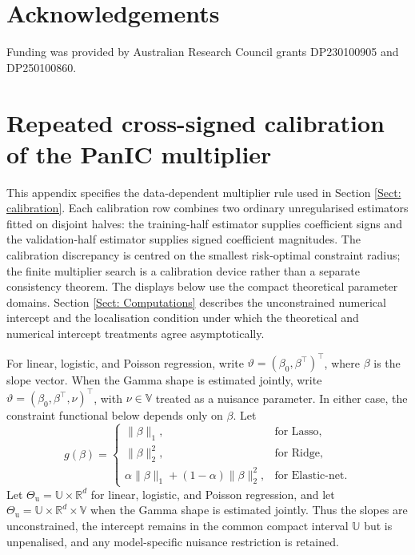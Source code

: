 \documentclass[12pt]{article}
\newenvironment{bluechange}{\begingroup\color[rgb]{0.00,0.00,1.00}}{\endgroup}
\theoremstyle{remark}
\theoremstyle{plain}
\begin{document}
\section*{Acknowledgements}
Funding was provided by Australian Research Council grants DP230100905 and DP250100860.

\appendix

\section[Repeated cross-signed calibration of the PanIC multiplier]{Repeated cross-signed calibration of the PanIC \mbox{multiplier}}\label{App: kappa calibration}
\begin{bluechange}
This appendix specifies the data-dependent multiplier rule used in Section \ref{Sect: calibration}. Each calibration row combines two ordinary unregularised estimators fitted on disjoint halves: the training-half estimator supplies coefficient signs and the validation-half estimator supplies signed coefficient magnitudes. The calibration discrepancy is centred on the smallest risk-optimal constraint radius; the finite multiplier search is a calibration device rather than a separate consistency theorem. The displays below use the compact theoretical parameter domains. Section \ref{Sect: Computations} describes the unconstrained numerical intercept and the localisation condition under which the theoretical and numerical intercept treatments agree asymptotically.

For linear, logistic, and Poisson regression, write $\vartheta=(\beta_0,\beta^\top)^\top$, where $\beta$ is the slope vector. When the Gamma shape is estimated jointly, write $\vartheta=(\beta_0,\beta^\top,\nu)^\top$, with $\nu\in\mathbb V$ treated as a nuisance parameter. In either case, the constraint functional below depends only on $\beta$. Let
\[
g(\beta)=
\begin{cases}
\|\beta\|_1, & \text{for Lasso},\\
\|\beta\|_2^2, & \text{for Ridge},\\
\alpha\|\beta\|_1+(1-\alpha)\|\beta\|_2^2, & \text{for Elastic-net}.
\end{cases}
\]
Let $\Theta_{\mathrm u}=\mathbb U\times\mathbb R^d$ for linear, logistic, and Poisson regression, and let $\Theta_{\mathrm u}=\mathbb U\times\mathbb R^d\times\mathbb V$ when the Gamma shape is estimated jointly. Thus the slopes are unconstrained, the intercept remains in the common compact interval $\mathbb U$ but is unpenalised, and any model-specific nuisance restriction is retained.


\end{bluechange}
\end{document}
